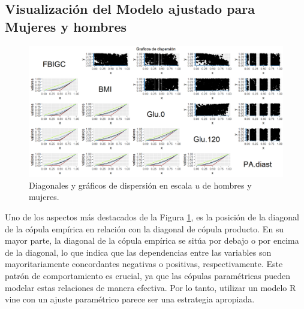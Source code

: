 \begin{landscape}
\subsection{Visualización del Modelo ajustado para Mujeres y hombres}

\begin{figure}[H]
    \centering
    \includegraphics[height = 13.5 cm, width = 1.4 \textwidth]{4img/UdiagT.png}
    \caption{Diagonales y gráficos de dispersión en escala $u$ de hombres y mujeres.}
    \label{fig:diagTot}
\end{figure}

\end{landscape}

Uno de los aspectos más destacados de la Figura \ref{fig:diagTot}, es la posición de la diagonal de la cópula empírica en relación con la diagonal de cópula producto. En su mayor parte, la diagonal de la cópula empírica se sitúa por debajo o por encima de la diagonal, lo que indica que las dependencias entre las variables son mayoritariamente concordantes negativas o positivas, respectivamente. Este patrón de comportamiento es crucial, ya que las cópulas paramétricas pueden modelar estas relaciones de manera efectiva. Por lo tanto, utilizar un modelo R vine con un ajuste paramétrico parece ser una estrategia apropiada.

